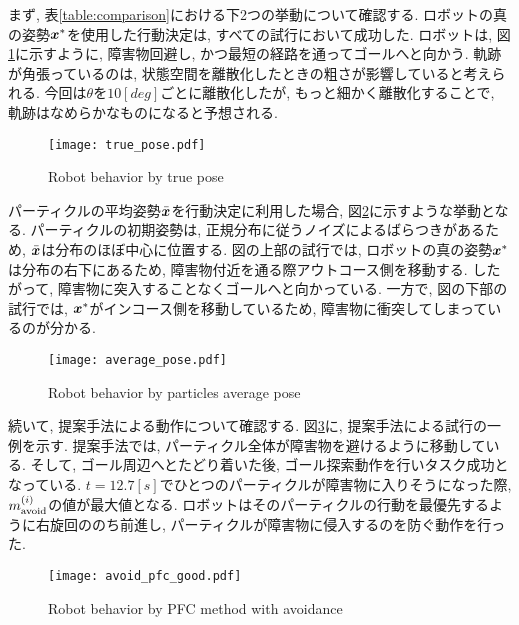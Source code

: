 まず, 表\ref{table:comparison}における下2つの挙動について確認する. 
ロボットの真の姿勢$\boldsymbol{x}^{*}$を使用した行動決定は, すべての試行において成功した. 
ロボットは, 図\ref{fig:true pose}に示すように, 障害物回避し, かつ最短の経路を通ってゴールへと向かう. 
軌跡が角張っているのは, 状態空間を離散化したときの粗さが影響していると考えられる. 
今回は$\theta$を$10[\si{deg}]$ごとに離散化したが, もっと細かく離散化することで, 軌跡はなめらかなものになると予想される. 

\begin{figure}[H]
  \begin{center}
    \texttt{[image: true\_pose.pdf]}
    \caption{Robot behavior by true pose}
    \label{fig:true pose}
  \end{center}
\end{figure}

パーティクルの平均姿勢$\bar{\boldsymbol{x}}$を行動決定に利用した場合, 図\ref{fig:average pose}に示すような挙動となる. 
パーティクルの初期姿勢は, 正規分布に従うノイズによるばらつきがあるため, $\bar{\boldsymbol{x}}$は分布のほぼ中心に位置する. 
図の上部の試行では, ロボットの真の姿勢$\boldsymbol{x}^{*}$は分布の右下にあるため, 障害物付近を通る際アウトコース側を移動する. 
したがって, 障害物に突入することなくゴールへと向かっている. 
一方で, 図の下部の試行では, $\boldsymbol{x}^{*}$がインコース側を移動しているため, 障害物に衝突してしまっているのが分かる. 

\begin{figure}[H]
  \begin{center}
    \texttt{[image: average\_pose.pdf]}
    \caption{Robot behavior by particles average pose}
    \label{fig:average pose}
  \end{center}
\end{figure}

続いて, 提案手法による動作について確認する. 
図\ref{fig:avoid pfc good}に, 提案手法による試行の一例を示す. 
提案手法では, パーティクル全体が障害物を避けるように移動している. 
そして, ゴール周辺へとたどり着いた後, ゴール探索動作を行いタスク成功となっている. 
$t=12.7[\si{s}]$でひとつのパーティクルが障害物に入りそうになった際, $m^{(i)}_{\rm avoid}$の値が最大値となる. 
ロボットはそのパーティクルの行動を最優先するように右旋回ののち前進し, パーティクルが障害物に侵入するのを防ぐ動作を行った. 

\begin{figure}[H]
  \begin{center}
    \texttt{[image: avoid\_pfc\_good.pdf]}
    \caption{Robot behavior by PFC method with avoidance}
    \label{fig:avoid pfc good}
  \end{center}
\end{figure}

